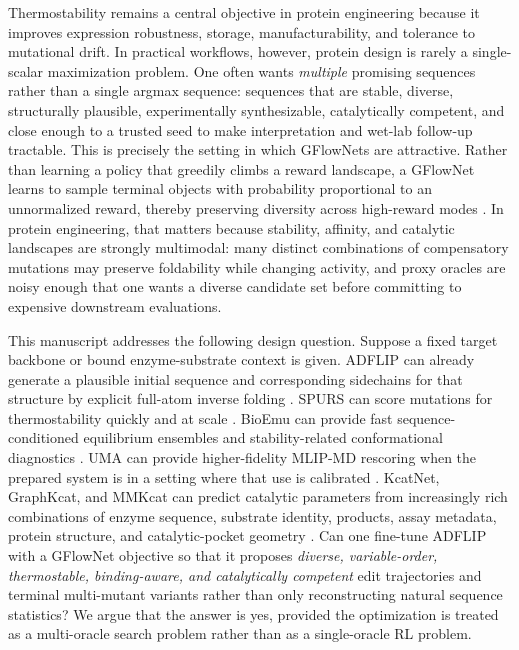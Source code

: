 \documentclass[11pt]{article}
\begin{document}
	Thermostability remains a central objective in protein engineering because it improves expression robustness, storage, manufacturability, and tolerance to mutational drift. In practical workflows, however, protein design is rarely a single-scalar maximization problem. One often wants \emph{multiple} promising sequences rather than a single argmax sequence: sequences that are stable, diverse, structurally plausible, experimentally synthesizable, catalytically competent, and close enough to a trusted seed to make interpretation and wet-lab follow-up tractable. This is precisely the setting in which GFlowNets are attractive. Rather than learning a policy that greedily climbs a reward landscape, a GFlowNet learns to sample terminal objects with probability proportional to an unnormalized reward, thereby preserving diversity across high-reward modes \citep{bengio2023gflownet,malkin2022trajectory,madan2023subtb}. In protein engineering, that matters because stability, affinity, and catalytic landscapes are strongly multimodal: many distinct combinations of compensatory mutations may preserve foldability while changing activity, and proxy oracles are noisy enough that one wants a diverse candidate set before committing to expensive downstream evaluations.
	
	This manuscript addresses the following design question. Suppose a fixed target backbone or bound enzyme-substrate context is given. ADFLIP can already generate a plausible initial sequence and corresponding sidechains for that structure by explicit full-atom inverse folding \citep{yi2025adflip}. SPURS can score mutations for thermostability quickly and at scale \citep{li2026spurs}. BioEmu can provide fast sequence-conditioned equilibrium ensembles and stability-related conformational diagnostics \citep{lewis2024bioemu}. UMA can provide higher-fidelity MLIP-MD rescoring when the prepared system is in a setting where that use is calibrated \citep{wood2025uma,levine2025omol25,fairchem2025github}. KcatNet, GraphKcat, and MMKcat can predict catalytic parameters from increasingly rich combinations of enzyme sequence, substrate identity, products, assay metadata, protein structure, and catalytic-pocket geometry \citep{pan2026kcatnet,luo2025graphkcat,sun2025mmkcat}. Can one fine-tune ADFLIP with a GFlowNet objective so that it proposes \emph{diverse, variable-order, thermostable, binding-aware, and catalytically competent} edit trajectories and terminal multi-mutant variants rather than only reconstructing natural sequence statistics? We argue that the answer is yes, provided the optimization is treated as a multi-oracle search problem rather than as a single-oracle RL problem.
	
\end{document}
